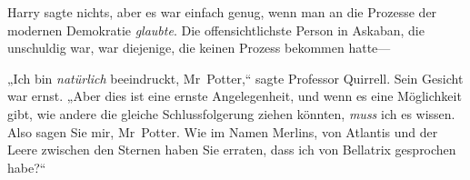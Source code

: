 Harry sagte nichts, aber es war einfach genug, wenn man an die Prozesse der modernen Demokratie \emph{glaubte}. Die offensichtlichste Person in Askaban, die unschuldig war, war diejenige, die keinen Prozess bekommen hatte—

„Ich bin \emph{natürlich} beeindruckt, Mr~Potter,“ sagte Professor Quirrell. Sein Gesicht war ernst. „Aber dies ist eine ernste Angelegenheit, und wenn es eine Möglichkeit gibt, wie andere die gleiche Schlussfolgerung ziehen könnten, \emph{muss} ich es wissen. Also sagen Sie mir, Mr~Potter. Wie im Namen Merlins, von Atlantis und der Leere zwischen den Sternen haben Sie erraten, dass ich von Bellatrix gesprochen habe?“

